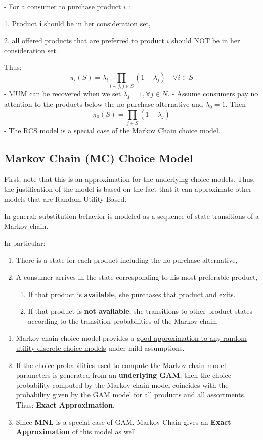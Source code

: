 \documentclass[11pt,a4paper]{article}
\begin{document}
- For a consumer to purchase product $i$ :

1. Product $\mathbf{i}$ should be in her consideration set,

2. all offered products that are preferred to product $i$ should NOT be in her consideration set.

Thus:
$$
\pi_{i}(S)=\lambda_{i} \prod_{i \prec j, j \in S}\left(1-\lambda_{j}\right) \quad \forall i \in S
$$
- MUM can be recovered when we set $\lambda_{\mathbf{j}}=1, \forall j \in N$.
- Assume consumers pay no attention to the products below the no-purchase alternative and $\lambda_{0}=1$. Then
$$
\pi_{0}(S)=\prod_{j \in S}\left(1-\lambda_{j}\right)
$$
- The RCS model is a \underline{special case of the Markov Chain choice model}.


\subsection{Markov Chain (MC) Choice Model}
First, note that this is an approximation for the underlying choice models.
Thus, the justification of the model is based on the fact that it can approximate other models that are Random Utility Based.

In general: substitution behavior is modeled as a sequence of state transitions of a Markov chain.

In particular:
\begin{enumerate}[(1)]
    \item There is a state for each product including the no-purchase alternative,
    \item A consumer arrives in the state corresponding to his most preferable product,
    \begin{enumerate}[$\bullet$]
        \item If that product is \textbf{available}, she purchases that product and exits.
        \item If that product is \textbf{not available}, she transitions to other product states according to the transition probabilities of the Markov chain.
    \end{enumerate}
\end{enumerate}

\begin{enumerate}[$\bullet$]
    \item Markov chain choice model provides a \underline{good approximation to any random utility discrete choice models} under mild assumptions.
    \item If the choice probabilities used to compute the Markov chain model parameters is generated from an \textbf{underlying GAM}, then the choice probability computed by the Markov chain model coincides with the probability given by the GAM model for all products and all assortments. Thus: \textbf{Exact Approximation}.
    \item Since \textbf{MNL} is a special case of GAM, Markov Chain gives an \textbf{Exact Approximation} of this model as well.
\end{enumerate}
\end{document}
